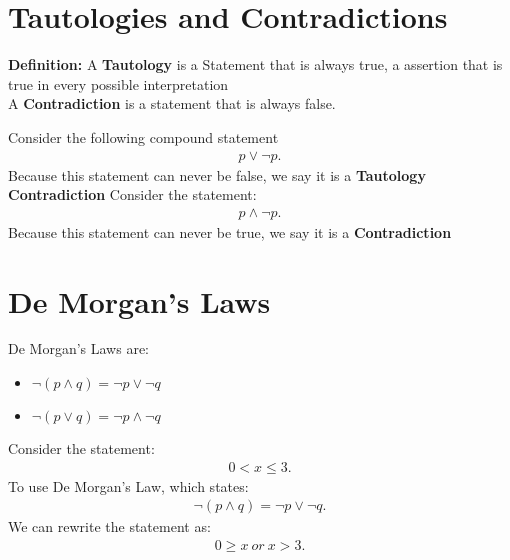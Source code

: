 \documentclass{report}
\begin{document}
    \pagebreak \bigbreak \noindent 
    \section{Tautologies and Contradictions}
    \bigbreak \noindent 
    \begin{mdframed}
        \textbf{Definition:}
          A \textbf{Tautology} is a Statement that is always true, a assertion that is true in every possible interpretation \\
          A \textbf{Contradiction} is a statement that is always false.
    \end{mdframed}
    \bigbreak \noindent 
    Consider the following compound statement
    \begin{align*}
        p \lor \neg p
    .\end{align*}
    \bigbreak \noindent 
    Because this statement can never be false, we say it is a \textbf{Tautology}
    \bigbreak \noindent 
    \textbf{Contradiction}
    \bigbreak \noindent 
    Consider the statement:
    \begin{align*}
         p \land \neg p
    .\end{align*}
    \bigbreak \noindent 
    Because this statement can never be true, we say it is a \textbf{Contradiction}

    \bigbreak \noindent \bigbreak \noindent 
    \section{De Morgan's Laws}
    \bigbreak \noindent 
    De Morgan's Laws are:
    \begin{itemize}
        \item $\neg(p\land q) = \neg p \lor \neg q$
        \item $\neg(p\lor q) = \neg p \land \neg q$
    \end{itemize}
    \bigbreak \noindent 
    Consider the statement:
    \begin{align*}
         0 < x \leq 3
    .\end{align*}
    \bigbreak \noindent 
    To use De Morgan's Law, which states:
    \begin{align*}
        \neg(p \land q) = \neg p \lor \neg q
    .\end{align*}
    We can rewrite the statement as:
    \begin{align*}
        0 \geq x\ or\ x > 3
    .\end{align*}
    
\end{document}
